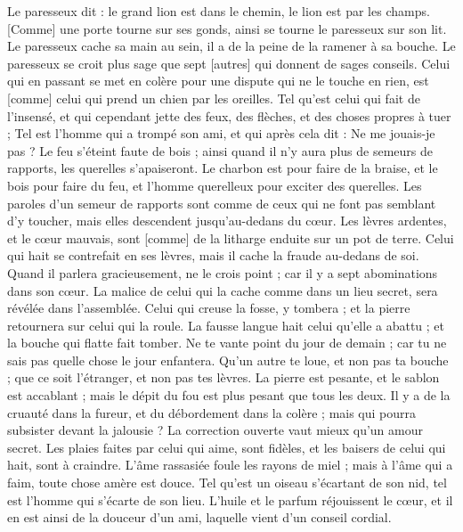 \begin{multicols}{2}
Le paresseux dit : le grand lion est dans le chemin, le lion est par les champs.
[Comme] une porte tourne sur ses gonds, ainsi se tourne le paresseux sur son lit.
Le paresseux cache sa main au sein, il a de la peine de la ramener à sa bouche.
Le paresseux se croit plus sage que sept [autres] qui donnent de sages conseils.
Celui qui en passant se met en colère pour une dispute qui ne le touche en rien, est [comme] celui qui prend un chien par les oreilles.
Tel qu'est celui qui fait de l'insensé, et qui cependant jette des feux, des flèches, et des choses propres à tuer ;
Tel est l'homme qui a trompé son ami, et qui après cela dit : Ne me jouais-je pas ?
Le feu s'éteint faute de bois ; ainsi quand il n'y aura plus de semeurs de rapports, les querelles s'apaiseront.
Le charbon est pour faire de la braise, et le bois pour faire du feu, et l'homme querelleux pour exciter des querelles.
Les paroles d'un semeur de rapports sont comme de ceux qui ne font pas semblant d'y toucher, mais elles descendent jusqu'au-dedans du cœur.
Les lèvres ardentes, et le cœur mauvais, sont [comme] de la litharge enduite sur un pot de terre.
Celui qui hait se contrefait en ses lèvres, mais il cache la fraude au-dedans de soi.
Quand il parlera gracieusement, ne le crois point ; car il y a sept abominations dans son cœur.
La malice de celui qui la cache comme dans un lieu secret, sera révélée dans l'assemblée.
Celui qui creuse la fosse, y tombera ; et la pierre retournera sur celui qui la roule.
La fausse langue hait celui qu'elle a abattu ; et la bouche qui flatte fait tomber.
\VerseOne{}Ne te vante point du jour de demain ; car tu ne sais pas quelle chose le jour enfantera.
Qu'un autre te loue, et non pas ta bouche ; que ce soit l'étranger, et non pas tes lèvres.
La pierre est pesante, et le sablon est accablant ; mais le dépit du fou est plus pesant que tous les deux.
Il y a de la cruauté dans la fureur, et du débordement dans la colère ; mais qui pourra subsister devant la jalousie ?
La correction ouverte vaut mieux qu'un amour secret.
Les plaies faites par celui qui aime, sont fidèles, et les baisers de celui qui hait, sont à craindre.
L'âme rassasiée foule les rayons de miel ; mais à l'âme qui a faim, toute chose amère est douce.
Tel qu'est un oiseau s'écartant de son nid, tel est l'homme qui s'écarte de son lieu.
L'huile et le parfum réjouissent le cœur, et il en est ainsi de la douceur d'un ami, laquelle vient d'un conseil cordial.

\end{multicols}
